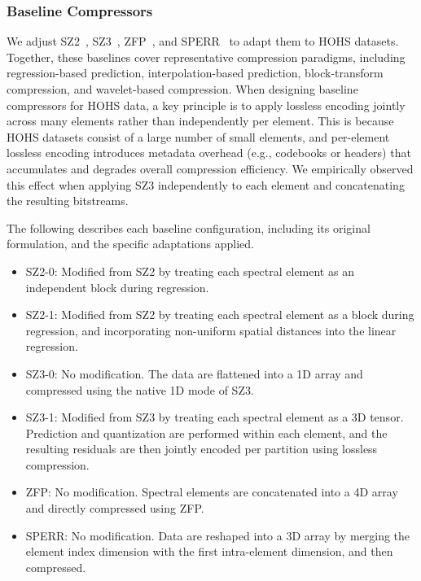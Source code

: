 \subsubsection{Baseline Compressors}\mbox{}

We adjust SZ2~\cite{tao2017significantly}, SZ3~\cite{liang2022sz3,zhao2021optimizing}, ZFP~\cite{lindstrom2014fixed}, and SPERR~\cite{li2023lossy} to adapt them to HOHS datasets. Together, these baselines cover representative compression paradigms, including regression-based prediction, interpolation-based prediction, block-transform compression, and wavelet-based compression. When designing baseline compressors for HOHS data, a key principle is to apply lossless encoding jointly across many elements rather than independently per element. This is because HOHS datasets consist of a large number of small elements, and per-element lossless encoding introduces metadata overhead (e.g., codebooks or headers) that accumulates and degrades overall compression efficiency. We empirically observed this effect when applying SZ3 independently to each element and concatenating the resulting bitstreams.

The following describes each baseline configuration, including its original formulation, and the specific adaptations applied.

\begin{itemize}
\item SZ2-0: Modified from SZ2 by treating each spectral element as an independent block during regression.
\item SZ2-1: Modified from SZ2 by treating each spectral element as a block during regression, and incorporating non-uniform spatial distances into the linear regression.
\item SZ3-0: No modification. The data are flattened into a 1D array and compressed using the native 1D mode of SZ3.
\item SZ3-1: Modified from SZ3 by treating each spectral element as a 3D tensor. Prediction and quantization are performed within each element, and the resulting residuals are then jointly encoded per partition using lossless compression.
\item ZFP: No modification. Spectral elements are concatenated into a 4D array and directly compressed using ZFP.
\item SPERR: No modification. Data are reshaped into a 3D array by merging the element index dimension with the first intra-element dimension, and then compressed.
\end{itemize}

